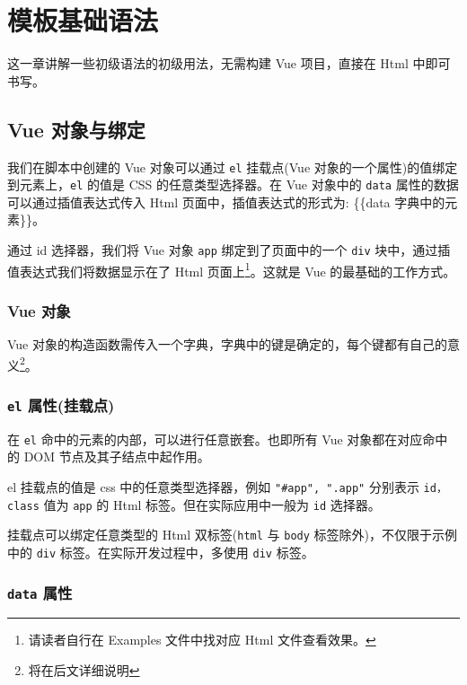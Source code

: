 \section{模板基础语法}

这一章讲解一些初级语法的初级用法，无需构建 Vue 项目，直接在 Html 中即可书写。

\subsection{Vue 对象与绑定}

我们在脚本中创建的 Vue 对象可以通过 \texttt{el} 挂载点(Vue 对象的一个属性)的值绑定到元素上，\texttt{el} 的值是 CSS 的任意类型选择器。在 Vue 对象中的 \texttt{data} 属性的数据可以通过插值表达式传入 Html 页面中，插值表达式的形式为: \{\{data 字典中的元素\}\}。



通过 id 选择器，我们将 Vue 对象 \texttt{app} 绑定到了页面中的一个 \texttt{div} 块中，通过插值表达式我们将数据显示在了 Html 页面上\footnote{请读者自行在 Examples 文件中找对应 Html 文件查看效果。}。这就是 Vue 的最基础的工作方式。

\subsubsection{Vue 对象}

Vue 对象的构造函数需传入一个字典，字典中的键是确定的，每个键都有自己的意义\footnote{将在后文详细说明}。

\subsubsection{\texttt{el} 属性(挂载点)}

在 \texttt{el} 命中的元素的内部，可以进行任意嵌套。也即所有 Vue 对象都在对应命中的 DOM 节点及其子结点中起作用。

el 挂载点的值是 css 中的任意类型选择器，例如 \texttt{"\#app", ".app"} 分别表示 \texttt{id，class} 值为 \texttt{app} 的 Html 标签。但在实际应用中一般为 \texttt{id} 选择器。

挂载点可以绑定任意类型的 Html 双标签(\texttt{html} 与 \texttt{body} 标签除外)，不仅限于示例中的 \texttt{div} 标签。在实际开发过程中，多使用 \texttt{div} 标签。

\subsubsection{\texttt{data} 属性}


